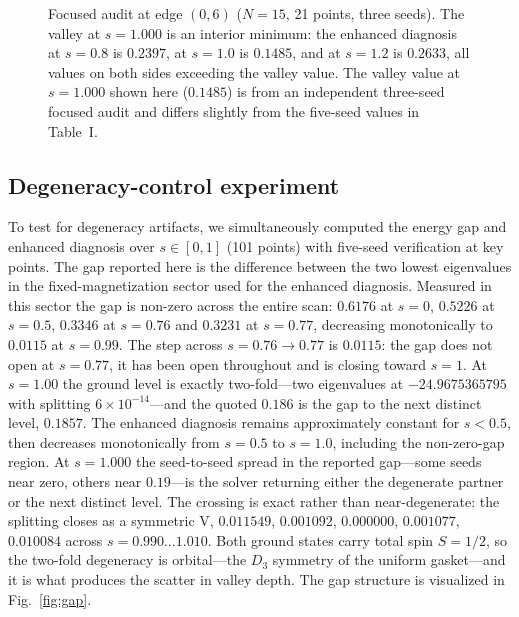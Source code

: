 \documentclass[aps,prb,reprint,superscriptaddress]{revtex4-2}
\begin{document}
\begin{figure}[t]
\centering
{}
\caption{Focused audit at edge $(0,6)$ ($N=15$, 21 points, three seeds). The valley at $s=1.000$ is an interior minimum: the enhanced diagnosis at $s=0.8$ is $0.2397$, at $s=1.0$ is $0.1485$, and at $s=1.2$ is $0.2633$, all values on both sides exceeding the valley value. The valley value at $s=1.000$ shown here ($0.1485$) is from an independent three-seed focused audit and differs slightly from the five-seed values in Table~I.}
\label{fig:focused}
\end{figure}

\subsection{Degeneracy-control experiment}

To test for degeneracy artifacts, we simultaneously computed the energy gap and enhanced diagnosis over $s\in[0,1]$ (101 points) with five-seed verification at key points. The gap reported here is the difference between the two lowest eigenvalues in the fixed-magnetization sector used for the enhanced diagnosis. Measured in this sector the gap is non-zero across the entire scan: $0.6176$ at $s=0$, $0.5226$ at $s=0.5$, $0.3346$ at $s=0.76$ and $0.3231$ at $s=0.77$, decreasing monotonically to $0.0115$ at $s=0.99$. The step across $s=0.76\to0.77$ is $0.0115$: the gap does not open at $s=0.77$, it has been open throughout and is closing toward $s=1$. At $s=1.00$ the ground level is exactly two-fold---two eigenvalues at $-24.9675365795$ with splitting $6\times10^{-14}$---and the quoted $0.186$ is the gap to the next distinct level, $0.1857$. The enhanced diagnosis remains approximately constant for $s<0.5$, then decreases monotonically from $s=0.5$ to $s=1.0$, including the non-zero-gap region. At $s=1.000$ the seed-to-seed spread in the reported gap---some seeds near zero, others near $0.19$---is the solver returning either the degenerate partner or the next distinct level. The crossing is exact rather than near-degenerate: the splitting closes as a symmetric V, $0.011549$, $0.001092$, $0.000000$, $0.001077$, $0.010084$ across $s=0.990\ldots1.010$. Both ground states carry total spin $S=1/2$, so the two-fold degeneracy is orbital---the $D_3$ symmetry of the uniform gasket---and it is what produces the scatter in valley depth. The gap structure is visualized in Fig.~\ref{fig:gap}.
\end{document}
